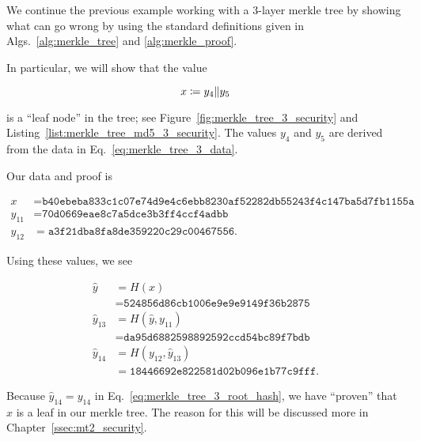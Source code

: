 \begin{example}
\label{example:hash_app_merkle_tree_security}

We continue the previous example working with a 3-layer \gls{merkle tree}
by showing what can go wrong by using the standard definitions
given in Algs.~\ref{alg:merkle_tree} and \ref{alg:merkle_proof}.

In particular, we will show that the value

\begin{equation}
    x \coloneqq{} y_{4}\|y_{5}
\end{equation}

\noindent
is a ``leaf node'' in the tree;
see Figure~\ref{fig:merkle_tree_3_security}
and Listing~\ref{list:merkle_tree_md5_3_security}.
The values $y_{4}$ and $y_{5}$ are derived from the data
in Eq.~\eqref{eq:merkle_tree_3_data}.




Our data and proof is

\begin{align}
    x  &=
    \texttt{b40ebeba833c1c07e74d9e4c6ebb8230af52282db55243f4c147ba5d7fb1155a}
        \nonumber\\
    y_{11} &= \texttt{70d0669eae8c7a5dce3b3ff4ccf4adbb}
        \nonumber\\
    y_{12} &= \texttt{a3f21dba8fa8de359220c29c00467556}.
\end{align}

\noindent
Using these values, we see

\begin{align}
    \hat{y} &= H(x) \nonumber\\
        &= \texttt{524856d86cb1006e9e9e9149f36b2875}
            \nonumber\\
    \hat{y}_{13} &= H(\hat{y}, y_{11}) \nonumber\\
        &= \texttt{da95d6882598892592ccd54bc89f7bdb
            }
            \nonumber\\
    \hat{y}_{14} &= H(y_{12}, \hat{y}_{13}) \nonumber\\
        &= \texttt{18446692e822581d02b096e1b77c9fff}.
\end{align}

\noindent
Because $\hat{y}_{14} = y_{14}$ in Eq.~\eqref{eq:merkle_tree_3_root_hash},
we have ``proven'' that $x$ is a leaf in our \gls{merkle tree}.
The reason for this will be discussed more in
Chapter~\ref{ssec:mt2_security}.
\end{example}



